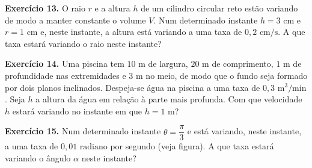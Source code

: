 \documentclass[12pt,a4paper]{article}
\begin{document}
\vspace{0.5cm}
\noindent\textbf{Exercício 13.}
O raio $r$ e a altura $h$ de um cilindro circular reto estão variando de modo a manter constante o volume $V$. Num determinado instante $h = 3\text{ cm}$ e $r = 1\text{ cm}$ e, neste instante, a altura está variando a uma taxa de $0{,}2\text{ cm/s}$. A que taxa estará variando o raio neste instante?

\vspace{0.5cm}
\noindent\textbf{Exercício 14.}
Uma piscina tem $10\text{ m}$ de largura, $20\text{ m}$ de comprimento, $1\text{ m}$ de profundidade nas extremidades e $3\text{ m}$ no meio, de modo que o fundo seja formado por dois planos inclinados. Despeja-se água na piscina a uma taxa de $0{,}3\text{ m}^3\text{/min}$. Seja $h$ a altura da água em relação à parte mais profunda. Com que velocidade $h$ estará variando no instante em que $h = 1\text{ m}$?

\begin{center}
\end{center}

\vspace{0.5cm}
\noindent\textbf{Exercício 15.}
Num determinado instante $\theta = \dfrac{\pi}{3}$ e está variando, neste instante, a uma taxa de $0{,}01\text{ radiano}$ por segundo (veja figura). A que taxa estará variando o ângulo $\alpha$ neste instante?
\end{document}

